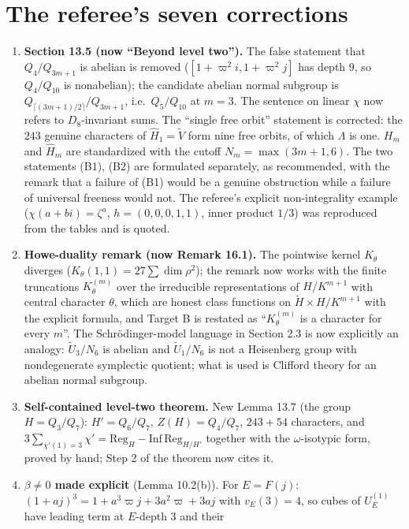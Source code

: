 \documentclass[11pt]{article}
\begin{document}
\section*{The referee's seven corrections}
\begin{enumerate}[leftmargin=*]
\item \textbf{Section 13.5 (now ``Beyond level two'').}  The false
statement that $Q_4/Q_{3m+1}$ is abelian is removed ($[1+\varpi^2i,1+\varpi^2j]$
has depth $9$, so $Q_4/Q_{10}$ is nonabelian); the candidate abelian
normal subgroup is $Q_{\lceil(3m+1)/2\rceil}/Q_{3m+1}$, i.e.\ $Q_5/Q_{10}$
at $m=3$.  The sentence on linear $\chi$ now refers to $D_8$-invariant
sums.  The ``single free orbit'' statement is corrected: the $243$
genuine characters of $\hat H_1=\tilde V$ form nine free orbits, of which
$\Lambda$ is one.  $H_m$ and $\hat H_m$ are standardized with the cutoff
$N_m=\max(3m+1,6)$.  The two statements (B1), (B2) are formulated
separately, as recommended, with the remark that a failure of (B1) would
be a genuine obstruction while a failure of universal freeness would not.
The referee's explicit non-integrality example
($\chi(a+bi)=\zeta^a$, $h=(0,0,0,1,1)$, inner product $1/3$) was
reproduced from the tables and is quoted.
\item \textbf{Howe-duality remark (now Remark 16.1).}  The pointwise
kernel $K_\theta$ diverges ($K_\theta(1,1)=27\sum\dim\rho^2$); the remark
now works with the finite truncations $K^{(m)}_\theta$ over the
irreducible representations of $H/K^{m+1}$ with central character
$\theta$, which are honest class functions on $\tilde H\times H/K^{m+1}$
with the explicit formula, and Target B is restated as ``$K^{(m)}_\theta$
is a character for every $m$''.  The Schr\"odinger-model language in
Section 2.3 is now explicitly an analogy: $\tilde U_3/N_6$ is abelian
and $\tilde U_1/N_6$ is not a Heisenberg group with nondegenerate
symplectic quotient; what is used is Clifford theory for an abelian
normal subgroup.
\item \textbf{Self-contained level-two theorem.}  New Lemma 13.7 (the
group $H=Q_3/Q_7$): $H'=Q_6/Q_7$, $Z(H)=Q_4/Q_7$, $243+54$ characters,
and $3\sum_{\chi'(1)=3}\chi'=\mathrm{Reg}_H-\mathrm{Inf}\,\mathrm{Reg}_{H/H'}$
together with the $\omega$-isotypic form, proved by hand; Step 2 of the
theorem now cites it.
\item \textbf{$\beta\neq0$ made explicit} (Lemma 10.2(b)).  For
$E=F(j)$: $(1+aj)^3=1+a^3\varpi j+3a^2\varpi+3aj$ with $v_E(3)=4$, so
cubes of $U_E^{(1)}$ have leading term at $E$-depth $3$ and their

\end{enumerate}
\end{document}
